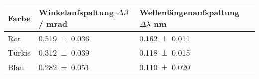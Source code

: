 \begin{tabular}{lll}
	\toprule
	Farbe & Winkelaufspaltung $\Delta\beta$ / \si{\milli\radian} & Wellenlängenaufspaltung $\Delta\lambda$ \si{\nano\metre}  \\
	\midrule
	Rot  &	\num{0.519+-0.036} &	\num{0.162+-0.011} \\
	Türkis  &	\num{0.312+-0.039} &	\num{0.118+-0.015} \\
	Blau  &	\num{0.282+-0.051} &	\num{0.110+-0.020} \\
	\bottomrule
\end{tabular}
